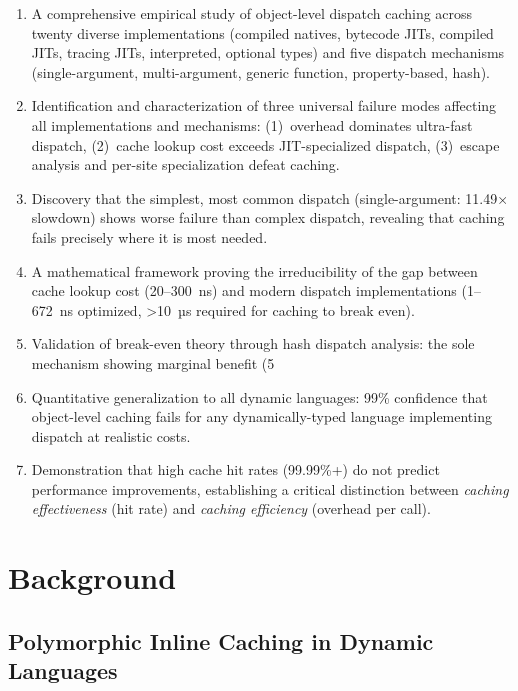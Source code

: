 \documentclass[sigplan,final]{acmart}
\begin{document}
\begin{enumerate}
  \item A comprehensive empirical study of object-level dispatch caching across twenty diverse
    implementations (compiled natives, bytecode JITs, compiled JITs, tracing JITs, interpreted, optional types) and
    five dispatch mechanisms (single-argument, multi-argument, generic function, property-based, hash).

  \item Identification and characterization of three universal failure modes affecting all
    implementations and mechanisms: (1)~overhead dominates ultra-fast dispatch, (2)~cache lookup cost
    exceeds JIT-specialized dispatch, (3)~escape analysis and per-site specialization defeat caching.

  \item Discovery that the simplest, most common dispatch (single-argument: 11.49× slowdown) shows
    worse failure than complex dispatch, revealing that caching fails precisely where it is most needed.

  \item A mathematical framework proving the irreducibility of the gap between cache lookup
    cost (20--300~ns) and modern dispatch implementations (1--672~ns optimized, >10~µs required
    for caching to break even).

  \item Validation of break-even theory through hash dispatch analysis: the sole mechanism showing
    marginal benefit (5%

  \item Quantitative generalization to all dynamic languages: 99\% confidence that object-level
    caching fails for any dynamically-typed language implementing dispatch at realistic costs.

  \item Demonstration that high cache hit rates (99.99\%+) do not predict performance improvements,
    establishing a critical distinction between \emph{caching effectiveness} (hit rate) and
    \emph{caching efficiency} (overhead per call).
\end{enumerate}

\section{Background}

\subsection{Polymorphic Inline Caching in Dynamic Languages}
\end{document}
